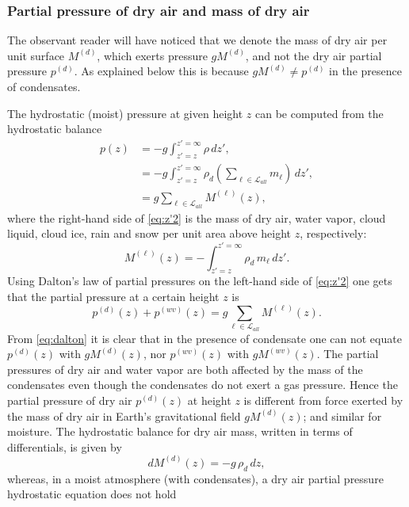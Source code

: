 \documentclass{agujournal}
\begin{document}
{\subsubsection{Partial pressure of dry air and mass of dry air}\label{sec:dryairp}
The observant reader will have noticed that we denote the mass of dry air per unit surface  $M^{(d)}$, which exerts pressure $gM^{(d)}$, and not the dry air partial pressure $p^{(d)}$. As explained below this is because $gM^{(d)}\neq p^{(d)}$ in the presence of condensates. 

The hydrostatic (moist) pressure at given height $z$ can be computed from the hydrostatic balance
\begin{align}
p(z)&=-g\int^{z'=\infty}_{z'=z}\rho\, dz',\\
 &=-g\int^{z'=\infty}_{z'=z}\rho_d \left( \sum_{\ell \in \mathcal{L}_{all}} m_\ell \right)\, dz',\\
 &=g\sum_{\ell \in \mathcal{L}_{all}} M^{(\ell)}(z),\label{eq:z'2}
\end{align}
where the right-hand side of \eqref{eq:z'2} is the mass of dry air, water vapor, cloud liquid, cloud ice, rain and snow per unit area above height $z$, respectively:
\begin{equation}
{M}^{(\ell)}(z)=-\int^{z'=\infty}_{z'=z}\rho_d \, m_\ell \, dz'\label{eq:z'}.
\end{equation}
Using Dalton's law of partial pressures on the left-hand side of \eqref{eq:z'2} one gets that the partial pressure at a certain height $z$ is
\begin{equation}
p^{(d)}(z)+p^{(wv)}(z)=g\sum_{\ell \in \mathcal{L}_{all}} {M}^{(\ell)}(z).\label{eq:dalton}
\end{equation}
From \eqref{eq:dalton} it is clear that in the presence of condensate one can not equate $p^{(d)}(z)$ with $g{M}^{(d)}(z)$, nor $p^{(wv)}(z)$ with $g{M}^{(wv)}(z)$. The partial pressures of dry air and water vapor are both affected by the mass of the condensates even though the condensates do not exert a gas pressure. Hence the partial pressure of dry air $p^{(d)}(z)$ at height $z$ is different from force exerted by the mass of dry air in Earth's gravitational field $gM^{(d)}(z)$; and similar for moisture. The hydrostatic balance for dry air mass, written in terms of differentials, is given by
\begin{equation}
dM^{(d)}(z)=-g\, \rho_d\, dz,\label{eq:dry_atm_hydro}
\end{equation}
whereas, in a moist atmosphere (with condensates), a dry air partial pressure hydrostatic equation does not hold
}
\end{document}

